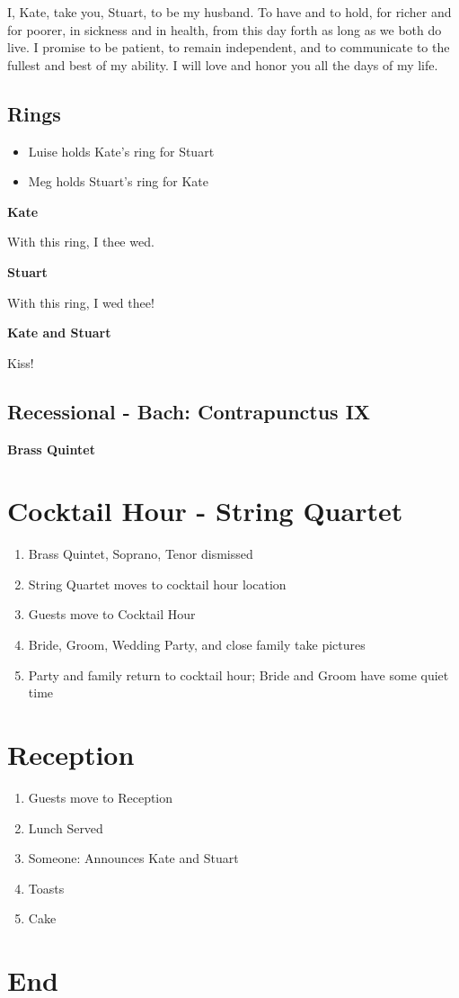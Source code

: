 \documentclass[twoside]{article}
\begin{document}
I, Kate, take you, Stuart, to be my husband. To have and to hold, for richer and for poorer, in sickness and in health, from this day forth as long as we both do live. I promise to be patient, to remain independent, and to communicate to the fullest and best of my ability. I will love and honor you all the days of my life.

  	   \subsection{Rings}
         \begin{itemize}
           \item Luise holds Kate's ring for Stuart
           \item Meg holds Stuart's ring for Kate
         \end{itemize}

          \begin{center}
          \textbf{Kate}
          \end{center}
  		    With this ring, I thee wed.
          \begin{center}
          \textbf{Stuart}
          \end{center}
          With this ring, I wed thee!
          \begin{center}
          \textbf{Kate and Stuart}
          \end{center}
          Kiss!
          
  	   \subsection{Recessional - Bach: Contrapunctus IX}
         \begin{center}
           \textbf{Brass Quintet}
         \end{center}

  \section{Cocktail Hour - String Quartet}
    \begin{enumerate}
    	\item Brass Quintet, Soprano, Tenor dismissed
    	\item String Quartet moves to cocktail hour location
    	\item Guests move to Cocktail Hour
    	\item Bride, Groom, Wedding Party, and close family take pictures
    	\item Party and family return to cocktail hour; Bride and Groom have some quiet time
    \end{enumerate}
    
  \section{Reception}
    \begin{enumerate}
      \item Guests move to Reception
      \item Lunch Served
      \item Someone: Announces Kate and Stuart
      \item Toasts
      \item Cake
    \end{enumerate}

  \section{End}
    
\end{document}
